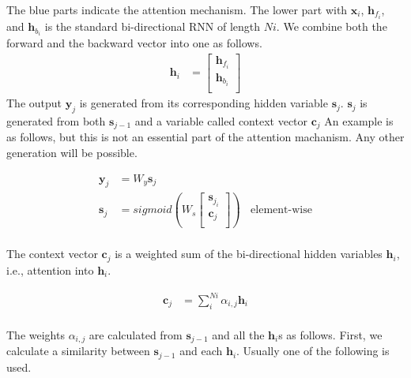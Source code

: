 \documentclass[a4]{article}
\begin{document}
The blue parts indicate the attention mechanism.
The lower part with $\bm{x}_i$, $\bm{h}_{f_i}$, and $\bm{h}_{b_i}$ is the standard
bi-directional RNN of length $Ni$. We combine both the forward and the backward vector into one as follows.
\begin{equation}
\begin{aligned}
\bm{h}_i &= 
\begin{bmatrix}
\bm{h}_{f_i}\\
\bm{h}_{b_i}\\
\end{bmatrix}
\end{aligned}
\end{equation}
The output $\bm{y}_j$ is generated from its corresponding hidden variable $\bm{s}_j$.
$\bm{s}_j$ is generated from both $\bm{s}_{j-1}$ and a variable called context vector $\bm{c}_{j}$
An example is as follows, but this is not an essential part of the attention machanism. Any other
generation will be possible.

\begin{equation}
\begin{aligned}
\bm{y}_j &= W_y\bm{s}_j\\
\bm{s}_j &= sigmoid\left( W_s 
\begin{bmatrix}
\bm{s}_{j_i}\\
\bm{c}_{j}\\
\end{bmatrix}
\right)\:\:\:\:\text{element-wise}\\
\end{aligned}
\end{equation}

The context vector $\bm{c}_{j}$ is a weighted sum of the bi-directional hidden variables $\bm{h}_i$,
i.e., attention into $\bm{h}_i$.

\begin{equation}
\begin{aligned}
\bm{c}_j &= \sum_{i}^{Ni}\alpha_{i,j}\bm{h}_i\\
\end{aligned}
\end{equation}

The weights $\alpha_{i,j}$ are calculated from $\bm{s}_{j-1}$ and all the $\bm{h}_i$s as follows.
First, we calculate a similarity between $\bm{s}_{j-1}$ and each $\bm{h}_i$. Usually one of the
following is used.
\end{document}
